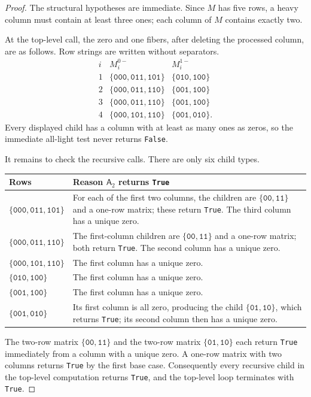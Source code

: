 \documentclass[11pt]{amsart}
\theoremstyle{definition}
\theoremstyle{remark}
\newcommand{\Aalg}{\mathsf A_2}
\newcommand{\bits}[1]{\texttt{#1}}
\newcommand{\True}{\texttt{True}}
\newcommand{\False}{\texttt{False}}
\begin{document}
\begin{proof}
The structural hypotheses are immediate. Since $M$ has five rows, a heavy column must contain at least three ones; each column of $M$ contains exactly two.

At the top-level call, the zero and one fibers, after deleting the processed column, are as follows. Row strings are written without separators.
\[
\begin{array}{c|c|c}
 i & M_i^{0-} & M_i^{1-}\\
\hline
1 & \{\bits{000},\bits{011},\bits{101}\} & \{\bits{010},\bits{100}\}\\
2 & \{\bits{000},\bits{011},\bits{110}\} & \{\bits{001},\bits{100}\}\\
3 & \{\bits{000},\bits{011},\bits{110}\} & \{\bits{001},\bits{100}\}\\
4 & \{\bits{000},\bits{101},\bits{110}\} & \{\bits{001},\bits{010}\}.
\end{array}
\]
Every displayed child has a column with at least as many ones as zeros, so the immediate all-light test never returns \False.

It remains to check the recursive calls. There are only six child types.
\begin{center}
\begin{tabular}{>{\raggedright\arraybackslash}p{} >{\raggedright\arraybackslash}p{}}
\toprule
Rows & Reason $\Aalg$ returns \True\\
\midrule
$\{\bits{000},\bits{011},\bits{101}\}$ & For each of the first two columns, the children are $\{\bits{00},\bits{11}\}$ and a one-row matrix; these return \True. The third column has a unique zero.\\
$\{\bits{000},\bits{011},\bits{110}\}$ & The first-column children are $\{\bits{00},\bits{11}\}$ and a one-row matrix; both return \True. The second column has a unique zero.\\
$\{\bits{000},\bits{101},\bits{110}\}$ & The first column has a unique zero.\\
$\{\bits{010},\bits{100}\}$ & The first column has a unique zero.\\
$\{\bits{001},\bits{100}\}$ & The first column has a unique zero.\\
$\{\bits{001},\bits{010}\}$ & Its first column is all zero, producing the child $\{\bits{01},\bits{10}\}$, which returns \True; its second column then has a unique zero.\\
\bottomrule
\end{tabular}
\end{center}
The two-row matrix $\{\bits{00},\bits{11}\}$ and the two-row matrix $\{\bits{01},\bits{10}\}$ each return \True{} immediately from a column with a unique zero. A one-row matrix with two columns returns \True{} by the first base case. Consequently every recursive child in the top-level computation returns \True, and the top-level loop terminates with \True.
\end{proof}
\end{document}
